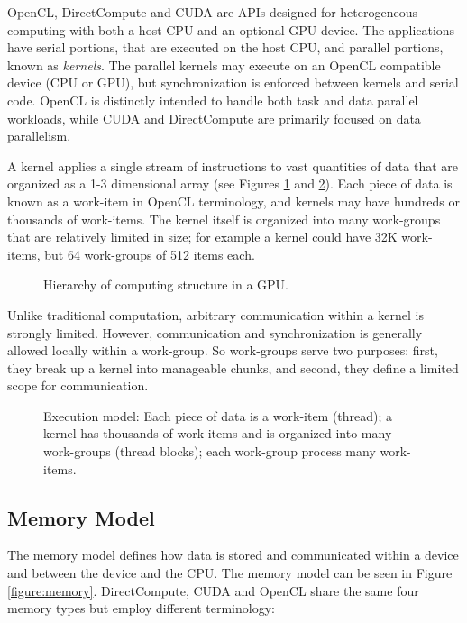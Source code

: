 \documentclass[review]{elsarticle}
\begin{document}
OpenCL, DirectCompute and CUDA are APIs designed for heterogeneous computing with both a host CPU and an optional GPU device. The applications have serial portions, that are executed on the host CPU, and parallel portions, known as \textit{kernels}. The parallel kernels may execute on an OpenCL compatible device (CPU or GPU), but synchronization is enforced between kernels and serial code. OpenCL is distinctly intended to handle both task and data parallel workloads, while CUDA and DirectCompute are primarily focused on data parallelism. 

A kernel applies a single stream of instructions to vast quantities of data that are organized as a 1-3 dimensional array (see Figures \ref{figure:captura1paperCEC} and \ref{figure:grid}). Each piece of data is known as a work-item in OpenCL terminology, and kernels may have hundreds or thousands of work-items. The kernel itself is organized into many work-groups that are relatively limited in size; for example a kernel could have 32K work-items, but 64 work-groups of 512 items each. 

\begin{figure}[h]
\centerline{}
\caption{Hierarchy of computing structure in a GPU.}
\label{figure:captura1paperCEC}
\end{figure}

Unlike traditional computation, arbitrary communication within a kernel is strongly limited. However, communication and synchronization is generally allowed locally within a work-group. So work-groups serve two purposes: first, they break up a kernel into manageable chunks, and second, they define a limited scope for communication. 

\begin{figure}[h]
\centerline{}
\caption{Execution model: Each piece of data is a work-item (thread); a kernel has thousands of work-items and is organized into many work-groups (thread blocks); each work-group process many work-items.}
\label{figure:grid}
\end{figure}

\subsection{Memory Model}

The memory model defines how data is stored and communicated within a device and between the device and the CPU. The memory model can be seen in Figure \ref{figure:memory}. DirectCompute, CUDA and OpenCL share the same four memory types but employ different terminology:
\end{document}
